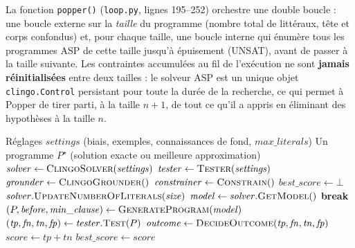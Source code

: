 La fonction \texttt{popper()} (\texttt{loop.py}, lignes 195--252)
orchestre une double boucle : une boucle externe sur la \emph{taille}
du programme (nombre total de littéraux, tête et corps confondus) et,
pour chaque taille, une boucle interne qui énumère tous les programmes
ASP de cette taille jusqu'à épuisement (UNSAT), avant de passer à la
taille suivante. Les contraintes accumulées au fil de l'exécution ne
sont \textbf{jamais réinitialisées} entre deux tailles : le solveur ASP
est un unique objet \texttt{clingo.Control} persistant pour toute la
durée de la recherche, ce qui permet à Popper de tirer parti, à la
taille $n+1$, de tout ce qu'il a appris en éliminant des hypothèses à la
taille $n$.

\begin{algorithm}[H]
\caption{Boucle principale de Popper (\texttt{popper.loop.popper})}
\label{alg:popper-loop}
\begin{algorithmic}[1]
\Require Réglages $\mathit{settings}$ (biais, exemples, connaissances de fond, $\mathit{max\_literals}$)
\Ensure Un programme $P^\star$ (solution exacte ou meilleure approximation)
\State $\mathit{solver} \gets \textsc{ClingoSolver}(\mathit{settings})$ 
\State $\mathit{tester} \gets \textsc{Tester}(\mathit{settings})$ 
\State $\mathit{grounder} \gets \textsc{ClingoGrounder}()$
\State $\mathit{constrainer} \gets \textsc{Constrain}()$
\State $\mathit{best\_score} \gets \bot$
 
    \State $\mathit{solver}.\textsc{UpdateNumberOfLiterals}(\mathit{size})$
        \State {}
        \State $\mathit{model} \gets \mathit{solver}.\textsc{GetModel}()$
            \State \textbf{break} 
        \EndIf
        \State $(P, \mathit{before}, \mathit{min\_clause}) \gets \textsc{GenerateProgram}(\mathit{model})$
        \State {}
        \State $(\mathit{tp}, \mathit{fn}, \mathit{tn}, \mathit{fp}) \gets \mathit{tester}.\textsc{Test}(P)$
        \State $\mathit{outcome} \gets \textsc{DecideOutcome}(\mathit{tp}, \mathit{fn}, \mathit{tn}, \mathit{fp})$
        \State $\mathit{score} \gets \mathit{tp} + \mathit{tn}$
            \State $\mathit{best\_score} \gets \mathit{score}$

\end{algorithmic}
\end{algorithm}
